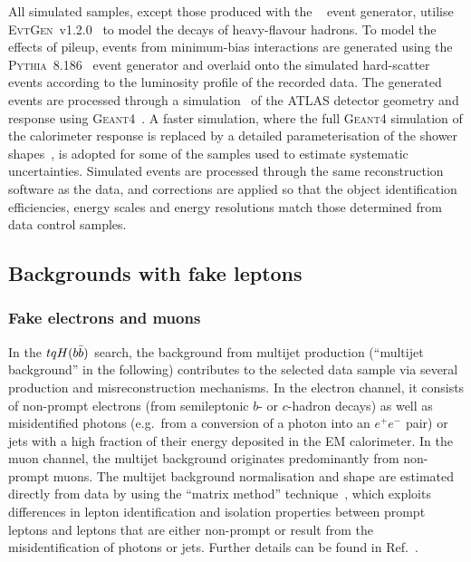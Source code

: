 All simulated samples, except those produced with the {\sherpa}~\cite{Gleisberg:2008ta} event generator, 
utilise \textsc{EvtGen}~v1.2.0~\cite{Lange:2001uf} to model the decays of heavy-flavour hadrons. 
To model the effects of pileup, events from minimum-bias interactions are generated using the \textsc{Pythia}~8.186~\cite{Sjostrand:2007gs} 
event generator and overlaid onto the simulated hard-scatter events according to the luminosity profile of the recorded data. 
The generated events are processed through a simulation~\cite{Aad:2010ah} of the ATLAS detector geometry and response 
using \textsc{Geant4}~\cite{Agostinelli:2002hh}. A faster simulation, where the full \textsc{Geant4} simulation of
the calorimeter response is replaced by a detailed parameterisation of the shower shapes~\cite{FastCaloSim},
is adopted for some of the samples used to estimate systematic uncertainties.
Simulated events are processed through the same reconstruction software as the data, and corrections are applied so that the object identification 
efficiencies, energy scales and energy resolutions match those determined from data control samples.

\subsection{Backgrounds with fake leptons}
\label{sec:fakeleptons}

\subsubsection{Fake electrons and muons}
In the $tqH(b\bar{b})$ search, the background from multijet production (``multijet background'' in the following) contributes to the selected 
data sample via several production and misreconstruction mechanisms.  
In the electron channel, it consists of non-prompt electrons (from semileptonic $b$- or $c$-hadron decays) as well as 
misidentified photons (e.g.~from a conversion of a photon into an $e^+e^-$ pair) or jets with a high fraction of 
their energy deposited in the EM calorimeter.  In the muon channel, the multijet background originates predominantly from 
non-prompt muons.  The multijet background normalisation and shape are estimated directly from data by using the ``matrix method''
technique~\cite{Aad:2010ey,ATLAS-CONF-2014-058}, which exploits differences in lepton identification and isolation properties between 
prompt leptons and leptons that are either non-prompt or result from the misidentification of photons or jets. 
Further details can be found in Ref.~\cite{ttbareson13TeV}.

